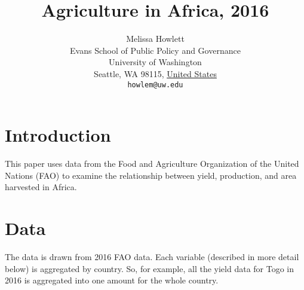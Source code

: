 \documentclass{article}
\title{Agriculture in Africa, 2016}
\author{
        Melissa Howlett\\
        Evans School of Public Policy and Governance\\
        University of Washington\\
        Seattle, WA 98115, \underline{United States}\\
        \texttt{howlem@uw.edu}
}
\begin{document}

\maketitle

\section{Introduction}\label{intro}
This paper uses data from the Food and Agriculture Organization of the United Nations (FAO) to examine the relationship between yield, production, and area harvested in Africa.

\section{Data}\label{datas}
The data is drawn from 2016 FAO data. Each variable (described in more detail below) is aggregated by country. So, for example, all the yield data for Togo in 2016 is aggregated into one amount for the whole country. 
\end{document}
